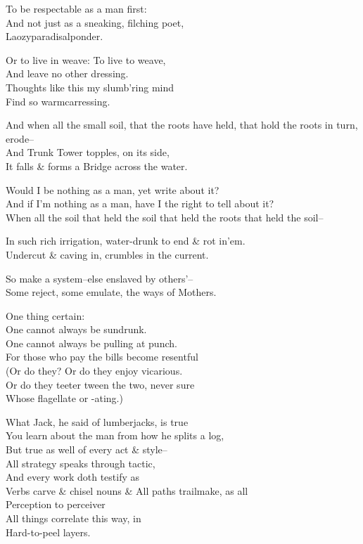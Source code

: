 To be respectable as a man first: \\
And not just as a sneaking, filching poet, \\
Laozyparadisalponder.

Or to live in weave: To live to weave, \\
And leave no other dressing. \\
Thoughts like this my slumb'ring mind \\
Find so warmcarressing.

And when all the small soil, that the roots have held, that hold the roots in turn, erode-- \\
And Trunk Tower topples, on its side, \\
It falls \& forms a Bridge across the water.

Would I be nothing as a man, yet write about it? \\
And if I'm nothing as a man, have I the right to tell about it? \\
When all the soil that held the soil that held the roots that held the soil--

In such rich irrigation, water-drunk to end \& rot in'em. \\
Undercut \& caving in, crumbles in the current.

So make a system--else enslaved by others'-- \\
Some reject, some emulate, the ways of Mothers.

One thing certain: \\ 
One cannot always be sundrunk. \\
One cannot always be pulling at punch. \\
For those who pay the bills become resentful \\
(Or do they? Or do they enjoy vicarious. \\
Or do they teeter tween the two, never sure \\
Whose flagellate or -ating.)

What Jack, he said of lumberjacks, is true \\
You learn about the man from how he splits a log, \\
But true as well of every act \& style-- \\
All strategy speaks through tactic, \\
And every work doth testify as \\
Verbs carve \& chisel nouns \&
All paths trailmake, as all \\
Perception to perceiver \\
All things correlate this way, in \\
Hard-to-peel layers.